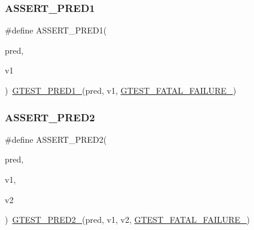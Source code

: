 \subsubsection{\texorpdfstring{ASSERT\_PRED1}{ASSERT\_PRED1}}
{\footnotesize\ttfamily \#define A\+S\+S\+E\+R\+T\+\_\+\+P\+R\+E\+D1(\begin{DoxyParamCaption}\item[{}]{pred,  }\item[{}]{v1 }\end{DoxyParamCaption})~\mbox{\hyperlink{_obj__test_2lib_2googletest-release-1_88_81_2googletest_2include_2gtest_2gtest__pred__impl_8h_ad44cf322952076d85305bbdf39769ac1}{G\+T\+E\+S\+T\+\_\+\+P\+R\+E\+D1\+\_\+}}(pred, v1, \mbox{\hyperlink{_obj__test_2lib_2googletest-release-1_88_81_2googletest_2include_2gtest_2internal_2gtest-internal_8h_a0f9a4c3ea82cc7bf4478eaffdc168358}{G\+T\+E\+S\+T\+\_\+\+F\+A\+T\+A\+L\+\_\+\+F\+A\+I\+L\+U\+R\+E\+\_\+}})}

\mbox{\label{_obj__test_2lib_2googletest-master_2googletest_2include_2gtest_2gtest__pred__impl_8h_a4e9b777cce4e5423f4c2e491be7aa818}} 
\subsubsection{\texorpdfstring{ASSERT\_PRED2}{ASSERT\_PRED2}}
{\footnotesize\ttfamily \#define A\+S\+S\+E\+R\+T\+\_\+\+P\+R\+E\+D2(\begin{DoxyParamCaption}\item[{}]{pred,  }\item[{}]{v1,  }\item[{}]{v2 }\end{DoxyParamCaption})~\mbox{\hyperlink{_obj__test_2lib_2googletest-release-1_88_81_2googletest_2include_2gtest_2gtest__pred__impl_8h_ac560264104bd030b64034505d294a7b6}{G\+T\+E\+S\+T\+\_\+\+P\+R\+E\+D2\+\_\+}}(pred, v1, v2, \mbox{\hyperlink{_obj__test_2lib_2googletest-release-1_88_81_2googletest_2include_2gtest_2internal_2gtest-internal_8h_a0f9a4c3ea82cc7bf4478eaffdc168358}{G\+T\+E\+S\+T\+\_\+\+F\+A\+T\+A\+L\+\_\+\+F\+A\+I\+L\+U\+R\+E\+\_\+}})}

\mbox{\label{_obj__test_2lib_2googletest-master_2googletest_2include_2gtest_2gtest__pred__impl_8h_aa7688f3ab9f09a2c1dbf13bd1f29d8fd}} 

